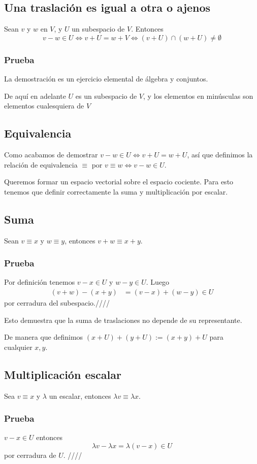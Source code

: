 \documentclass{article}
\begin{document}
\subsection{Una traslación es igual a otra o ajenos}\label{traslaciones}
Sean $v$ y $w$ en $V$, y $U$ un subespacio de $V$. Entonces
$$v-w\in U \iff v+U = w+V \iff (v+U)\cap(w+U)\neq\emptyset$$
\subsubsection*{Prueba}
La demostración es un ejercicio elemental de álgebra y conjuntos.

De aquí en adelante $U$ es un subespacio de $V$, y los elementos en
minúsculas son elementos cualesquiera de $V$
\subsection{Equivalencia}
Como acabamos de demostrar $v-w\in U \iff v+U=w+U$,
así que definimos la relación de equivalencia $\equiv$ por
$v\equiv w \iff v-w\in U$.

Queremos formar un espacio vectorial sobre el espacio cociente.
Para esto tenemos que definir correctamente la suma y multiplicación 
por escalar.

\subsection{Suma}
Sean $v\equiv x$ y $w\equiv y$, entonces $v+w \equiv x+y$.
\subsubsection*{Prueba}
Por definición tenemos $v-x\in U$ y $w-y\in U$.
Luego
\begin{align*}
    (v+w) - (x+y) &= (v-x) + (w-y) \in U
\end{align*} 
por cerradura del subespacio.\hfill ////

Esto demuestra que la suma de traslaciones no depende de su
representante.

De manera que definimos $(x+U)+(y+U) := (x+y)+U$ para \\
cualquier $x,y$.


\subsection{Multiplicación escalar}
Sea $v\equiv x$ y $\lambda$ un escalar, entonces
$\lambda v\equiv \lambda x$.
\subsubsection*{Prueba}
$v-x\in U$ entonces
$$\lambda v -\lambda x = \lambda(v-x) \in U$$
por cerradura de $U$. \hfill ////
\end{document}
